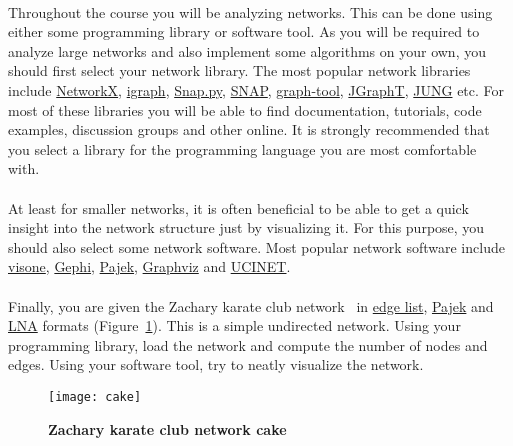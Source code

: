 \documentclass[11pt,a4paper]{article}
\newcommand{\figref}[1]{{\color{LimeGreen}Figure~\ref{fig:#1}}}
\begin{document}
\paragraph{} Throughout the course you will be analyzing networks. This can be done using either some programming library or software tool. As you will be required to analyze large networks and also implement some algorithms on your own, you should first select your network library. The most popular network libraries include \href{https://networkx.github.io}{NetworkX}, \href{http://igraph.org}{igraph}, \href{https://snap.stanford.edu/snappy/}{Snap.py}, \href{http://snap.stanford.edu}{SNAP}, \href{https://graph-tool.skewed.de}{graph-tool}, \href{https://github.com/jgrapht/jgrapht}{JGraphT}, \href{http://jung.sourceforge.net}{JUNG} etc. For most of these libraries you will be able to find documentation, tutorials, code examples, discussion groups and other online. It is strongly recommended that you select a library for the programming language you are most comfortable with.

\paragraph{} At least for smaller networks, it is often beneficial to be able to get a quick insight into the network structure just by visualizing it. For this purpose, you should also select some network software. Most popular network software include \href{http://visone.info}{visone}, \href{http://gephi.github.io}{Gephi}, \href{http://mrvar.fdv.uni-lj.si/pajek/}{Pajek}, \href{http://www.graphviz.org}{Graphviz} and \href{https://sites.google.com/site/ucinetsoftware/home}{UCINET}.

\paragraph{} Finally, you are given the Zachary karate club network~\cite{Zac77} in \href{http://lovro.lpt.fri.uni-lj.si/ina/nets/karate_club.adj}{edge list}, \href{http://lovro.lpt.fri.uni-lj.si/ina/nets/karate_club.net}{Pajek} and \href{http://lovro.lpt.fri.uni-lj.si/ina/nets/karate_club}{LNA} formats (\figref{cake}). This is a simple undirected network. Using your programming library, load the network and compute the number of nodes and edges. Using your software tool, try to neatly visualize the network.

\begin{figure}[b] \centering
	\texttt{[image: cake]}
	\caption{{\bf Zachary karate club network cake}}
	\label{fig:cake}
\end{figure}
\end{document}

